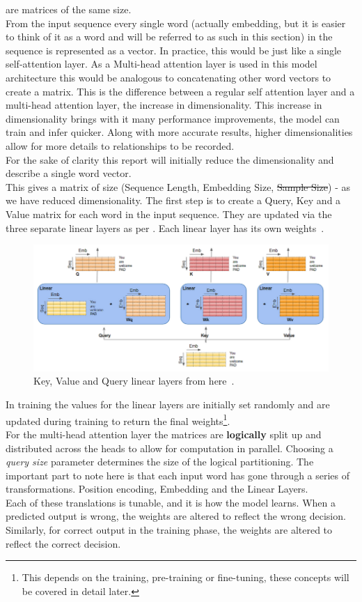 are matrices of the same size.\\
From the input sequence every single word (actually embedding, but it is easier to think of it as a word and will be referred to as such in this section)
in the sequence is represented as a vector. In practice, this would be just like a single self-attention layer. As a Multi-head attention layer is used in this
model architecture this would be analogous to concatenating other word vectors to create a matrix. This is the difference between a regular self attention layer
and a multi-head attention layer, the increase in dimensionality. This increase in dimensionality brings with it many performance improvements, the model
can train and infer quicker. Along with more accurate results, higher dimensionalities allow for more details to relationships to be recorded.\\
For the sake of clarity this report will initially reduce the dimensionality and describe a single word vector.\\
This gives a matrix of size (Sequence Length, Embedding Size, \sout{Sample Size}) - as we have reduced dimensionality.
\bigbreak
The first step is to create a Query, Key and a Value matrix for each word in the input sequence. They are updated via the three separate linear layers as per . Each linear layer has its own weights~\autocite{alammarIllustratedTransformer}.
\begin{figure}[H]
	\centering
	\includegraphics[width=1\textwidth]{figures/k_v_q_linear_layers.png}
	\caption{Key, Value and Query linear layers from here~\autocite{doshiTransformersExplainedVisually2021a}.}
	\label{fig:kvq_ll}
\end{figure}
In training the values for the linear layers are initially set randomly and are updated during training to return the
final weights\footnote{This depends on the training, pre-training or fine-tuning, these concepts will be covered in detail later.}. \\
For the multi-head attention layer the matrices are \textbf{logically} split up and distributed across the heads to allow for computation in parallel.
Choosing a \emph{query size} parameter determines the size of the logical partitioning.
\bigbreak
The important part to note here is that each input word has gone through a series of transformations. Position encoding, Embedding and the Linear
Layers.\\
Each of these translations is tunable, and it is how the model learns. When a predicted output is wrong, the weights are altered to reflect the
wrong decision. Similarly, for correct output in the training phase, the weights are altered to reflect the correct decision.
